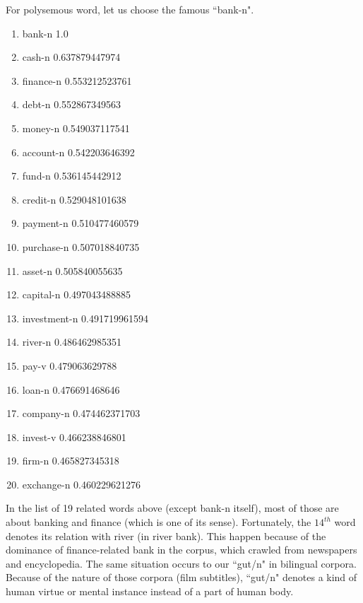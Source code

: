 \documentclass[12pt]{article}
\begin{document}
For polysemous word, let us choose the famous ``bank-n".
\begin{enumerate}
	\item bank-n 1.0
	\item cash-n 0.637879447974
	\item finance-n 0.553212523761
	\item debt-n 0.552867349563
	\item money-n 0.549037117541
	\item account-n 0.542203646392
	\item fund-n 0.536145442912
	\item credit-n 0.529048101638
	\item payment-n 0.510477460579
	\item purchase-n 0.507018840735
	\item asset-n 0.505840055635
	\item capital-n 0.497043488885
	\item investment-n 0.491719961594
	\item river-n 0.486462985351
	\item pay-v 0.479063629788
	\item loan-n 0.476691468646
	\item company-n 0.474462371703
	\item invest-v 0.466238846801
	\item firm-n 0.465827345318
	\item exchange-n 0.460229621276
\end{enumerate}

In the list of 19 related words above (except bank-n itself), most of those are about banking and finance (which is one of its sense). Fortunately, the $14^{th}$ word denotes its relation with river (in river bank). This happen because of the dominance of finance-related bank in the corpus, which crawled from newspapers and encyclopedia. The same situation occurs to our ``gut/n" in bilingual corpora. Because of the nature of those corpora (film subtitles), ``gut/n" denotes a kind of human virtue or mental instance instead of a part of human body.
\end{document}
